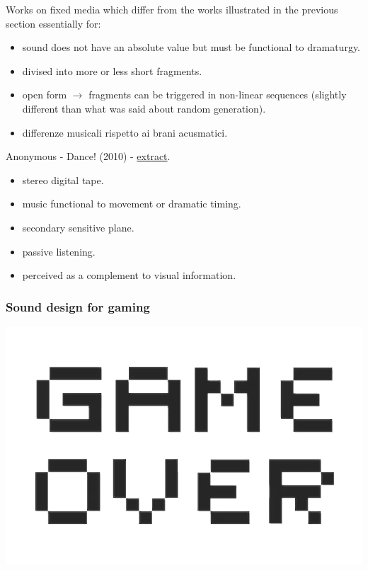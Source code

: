 Works on fixed media which differ from the works illustrated in the previous section essentially for:

\begin{itemize}
\tightlist
\item sound does not have an absolute value but must be functional to dramaturgy.
\item divised into more or less short fragments.
\item open form \(\rightarrow\) fragments can be triggered in non-linear sequences (slightly different than what was said about random generation).
\item differenze musicali rispetto ai brani acusmatici.
\end{itemize}

Anonymous - Dance! (2010) - \href{suoni/dance.mp3}{extract}.

\begin{itemize}
\tightlist 
\item stereo digital tape. 
\item music functional to movement or dramatic timing.
\item secondary sensitive plane. 
\item passive listening. 
\item perceived as a complement to visual information.
\end{itemize}

\subsubsection{Sound design for gaming}\label{sound-design-for-gaming}

\begin{center}
\includegraphics[scale=0.4]{../img/game.png}
\end{center}


